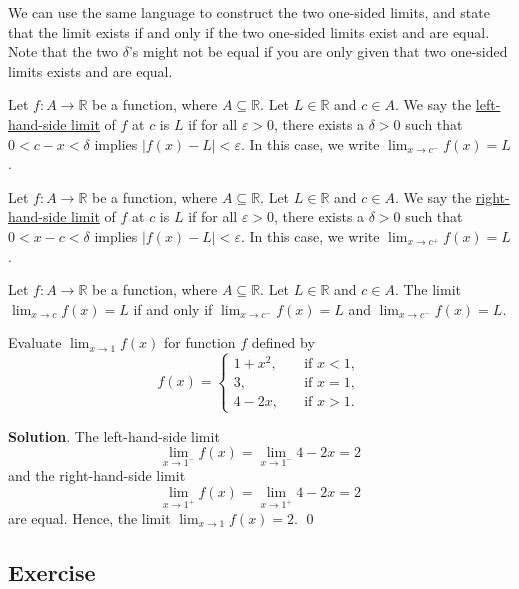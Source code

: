 \documentclass[11pt]{book}
\theoremstyle{break}
\theoremstyle{no_label}
\newcommand{\bbR}{\mathbb{R}}
\numberwithin{equation}{section}
\begin{document}
We can use the same language to construct the two one-sided limits, and state that the limit exists if and only if the two one-sided limits exist and are equal. Note that the two $\delta$'s might not be equal if you are only given that two one-sided limits exists and are equal.

\begin{definition}
    Let $f:A\to\bbR$ be a function, where $A\subseteq\bbR$. Let $L\in\bbR$ and $c\in A$. We say the \underline{left-hand-side limit} of $f$ at $c$ is $L$ if for all $\varepsilon>0$, there exists a $\delta>0$ such that $0<c-x<\delta$ implies $|f(x)-L|<\varepsilon$. In this case, we write $\displaystyle\lim_{x\to c^-}f(x)=L$.
\end{definition}

\begin{definition}
    Let $f:A\to\bbR$ be a function, where $A\subseteq\bbR$. Let $L\in\bbR$ and $c\in A$. We say the \underline{right-hand-side limit} of $f$ at $c$ is $L$ if for all $\varepsilon>0$, there exists a $\delta>0$ such that $0<x-c<\delta$ implies $|f(x)-L|<\varepsilon$. In this case, we write $\displaystyle\lim_{x\to c^+}f(x)=L$.
\end{definition}

\begin{theorem}
    Let $f:A\to\bbR$ be a function, where $A\subseteq\bbR$. Let $L\in\bbR$ and $c\in A$. The limit $\displaystyle\lim_{x\to c}f(x)=L$ if and only if $\displaystyle\lim_{x\to c^-}f(x)=L$ and $\displaystyle\lim_{x\to c^-}f(x)=L$.
\end{theorem}

\begin{example}
    Evaluate $\displaystyle\lim_{x\to 1}f(x)$ for function $f$ defined by $$f(x)=\left\{\begin{array}{rl}
        1+x^2, \quad & \text{if $x<1$},\\
        3, \quad & \text{if $x=1$},\\
        4-2x, \quad & \text{if $x>1$}.
    \end{array}\right.$$
\end{example}
\textbf{Solution}. The left-hand-side limit $$\lim_{x\to 1^-}f(x)=\lim_{x\to 1^-}4-2x=2$$ and the right-hand-side limit $$\lim_{x\to 1^+}f(x)=\lim_{x\to 1^+}4-2x=2$$ are equal. Hence, the limit $\displaystyle\lim_{x\to 1}f(x)=2$. \qed

\subsection*{Exercise}
\end{document}
